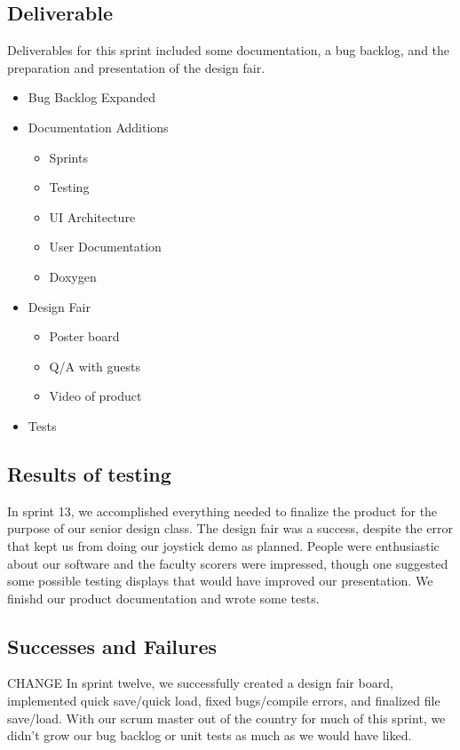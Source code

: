 \subsection{Deliverable}

Deliverables for this sprint included some documentation, a bug backlog, and the preparation and presentation of the design fair. 

\begin{itemize}
	\item Bug Backlog Expanded
	\item Documentation	Additions	
	\begin{itemize}
		\item Sprints
		\item Testing
		\item UI Architecture
		\item User Documentation
		\item Doxygen
	\end{itemize}
	\item Design Fair	
	\begin{itemize}
    	\item Poster board
    	\item Q/A with guests
    	\item Video of product
	\end{itemize}
	\item Tests
\end{itemize}

\subsection{Results of testing}
In sprint 13, we accomplished everything needed to finalize the product for the purpose of our senior design class. The design fair was a success, despite the error that kept us from doing our joystick demo as planned. People were enthusiastic about our software and the faculty scorers were impressed, though one suggested some possible testing displays that would have improved our presentation. We finishd our product documentation and wrote some tests.

\subsection{Successes and Failures}
CHANGE
In sprint twelve, we successfully created a design fair board, implemented quick save/quick load, fixed bugs/compile errors, and finalized file save/load. With our scrum master out of the country for much of this sprint, we didn't grow our bug backlog or unit tests as much as we would have liked.


